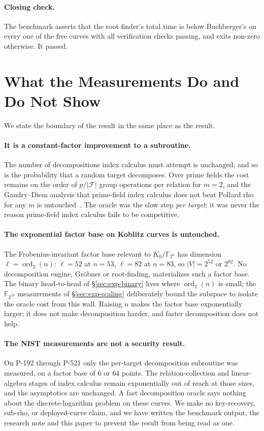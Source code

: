 \documentclass[10pt,a4paper]{article}
\theoremstyle{remark}
\newcommand{\FF}{\mathbb{F}}
\newcommand{\Fb}{\mathcal{F}}
\newcommand{\abs}[1]{\lvert #1 \rvert}
\begin{document}
\paragraph{Closing check.} The benchmark asserts that the root finder's
total time is below Buchberger's on every one of the five curves with
all verification checks passing, and exits non-zero otherwise. It
passed.

\section{What the Measurements Do and Do Not Show}
\label{sec:boundary}

We state the boundary of the result in the same place as the result.

\paragraph{It is a constant-factor improvement to a subroutine.} The
number of decompositions index calculus must attempt is unchanged, and
so is the probability that a random target decomposes. Over prime
fields the cost remains on the order of $p/\abs{\Fb}$ group operations
per relation for $m = 2$, and the Gaudry--Diem analysis that
prime-field index calculus does not beat Pollard rho for any $m$ is
untouched~\cite{gaudry2009,diem2011}. The oracle was the slow step
\emph{per target}; it was never the reason prime-field index calculus
fails to be competitive.

\paragraph{The exponential factor base on Koblitz curves is untouched.}
The Frobenius-invariant factor base relevant to $K_0/\FF_{2^n}$ has
dimension $\ell = \operatorname{ord}_2(n)$: $\ell = 52$ at $n = 53$,
$\ell = 82$ at $n = 83$, so $\abs{V} = 2^{52}$ or $2^{82}$. No
decomposition engine, Gr\"obner or root-finding, materializes such a
factor base. The binary head-to-head of \S\ref{sec:exp-binary} lives
where $\operatorname{ord}_2(n)$ is small; the $\FF_{2^{53}}$
measurements of \S\ref{sec:exp-scaling} deliberately bound the subspace
to isolate the oracle cost from this wall. Raising $n$ makes the factor
base exponentially larger; it does not make decomposition harder, and
faster decomposition does not help.

\paragraph{The NIST measurements are not a security result.} On
P-192 through P-521 only the per-target decomposition subroutine was
measured, on a factor base of $6$ or $64$ points. The relation-collection
and linear-algebra stages of index calculus remain exponentially out of
reach at those sizes, and the asymptotics are unchanged. A fast
decomposition oracle says nothing about the discrete-logarithm problem
on these curves. We make no key-recovery, sub-rho, or deployed-curve
claim, and we have written the benchmark output, the research note and
this paper to prevent the result from being read as one.
\end{document}
